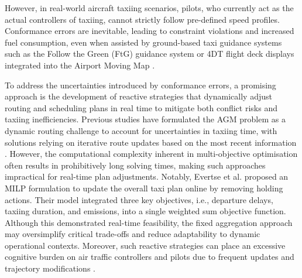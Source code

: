 \documentclass{article}
\begin{document}
However, in real-world aircraft taxiing scenarios, pilots, who currently act as the actual controllers of taxiing, cannot strictly follow pre-defined speed profiles. Conformance errors are inevitable, leading to constraint violations and increased fuel consumption, even when assisted by ground-based taxi guidance systems such as the Follow the Green (FtG) guidance system \cite{zhang2020feasibility} or 4DT flight deck displays integrated into the Airport Moving Map \cite{bakowski2017flight}. 

To address the uncertainties introduced by conformance errors, a promising approach is the development of reactive strategies that dynamically adjust routing and scheduling plans in real time to mitigate both conflict risks and taxiing inefficiencies. Previous studies have formulated the AGM problem as a dynamic routing challenge to account for uncertainties in taxiing time, with solutions relying on iterative route updates based on the most recent information \cite{roling2008optimal, roling2009airport, brownlee2018rolling, zou2018two}. However, the computational complexity inherent in multi-objective optimisation often results in prohibitively long solving times, making such approaches impractical for real-time plan adjustments. Notably, Evertse et al. \cite{evertse2017real} proposed an MILP formulation to update the overall taxi plan online by removing holding actions. Their model integrated three key objectives, i.e., departure delays, taxiing duration, and emissions, into a single weighted sum objective function. Although this demonstrated real-time feasibility, the fixed aggregation approach may oversimplify critical trade-offs and reduce adaptability to dynamic operational contexts. Moreover, such reactive strategies can place an excessive cognitive burden on air traffic controllers and pilots due to frequent updates and trajectory modifications \cite{okuniek2016concept}.
\end{document}

